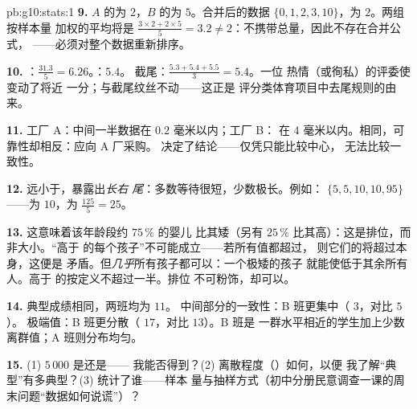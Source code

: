 \begin{solution}{pb:g10:stats:1}
\textbf{9.} $A$ 的为 $2$，$B$ 的为 $5$。合并后的数据
$\{0, 1, 2, 3, 10\}$，为 $2$。两组按样本量
加权的平均将是 $\frac{3 \times 2 + 2 \times 5}{5} = 3.2
\neq 2$：不携带总量，因此不存在合并公式，
——必须对整个数据重新排序。

\textbf{10.} ：$\frac{31.3}{5} = 6.26$。：$5.4$。
截尾：$\frac{5.3 + 5.4 + 5.5}{3} = 5.4$。一位
热情（或徇私）的评委使变动了将近
一分；与截尾纹丝不动——这正是
评分类体育项目中去尾规则的由来。

\textbf{11.} 工厂 A：中间一半数据在 $0.2$ 毫米以内；工厂 B：
在 $4$ 毫米以内。相同，可靠性却相反：应向 A 厂采购。
决定了结论——仅凭只能比较中心，
无法比较一致性。

\textbf{12.} 远小于，暴露出\emph{长右
尾}：多数等待很短，少数极长。例如：
$\{5, 5, 10, 10, 95\}$——为 $10$，为
$\frac{125}{5} = 25$。

\textbf{13.} 这意味着该年龄段约 $75\,\%$ 的婴儿
比其矮（另有 $25\,\%$ 比其高）：这是排位，而非大小。“高于
的每个孩子”不可能成立——若所有值都超过，
则它们的将超过本身，这便是
矛盾。但\emph{几乎}所有孩子都可以：一个极矮的孩子
就能使低于其余所有人。高于
\emph{}的按定义不超过一半。排位
不可粉饰，却可以。

\textbf{14.} 典型成绩相同，两班均为 $11$。
中间部分的一致性：B 班更集中（ $3$，对比 $5$）。
极端值：B 班更分散（ $17$，对比 $13$）。B 班是
一群水平相近的学生加上少数离群值；A 班则分布均匀。

\textbf{15.} (1) $5\,000$ 是还是——
我能否得到？(2) 离散程度（）如何，以便
我了解“典型”有多典型？(3) 统计了谁——样本
量与抽样方式（初中分册民意调查一课的周末问题“数据如何说谎”）？


\end{solution}
